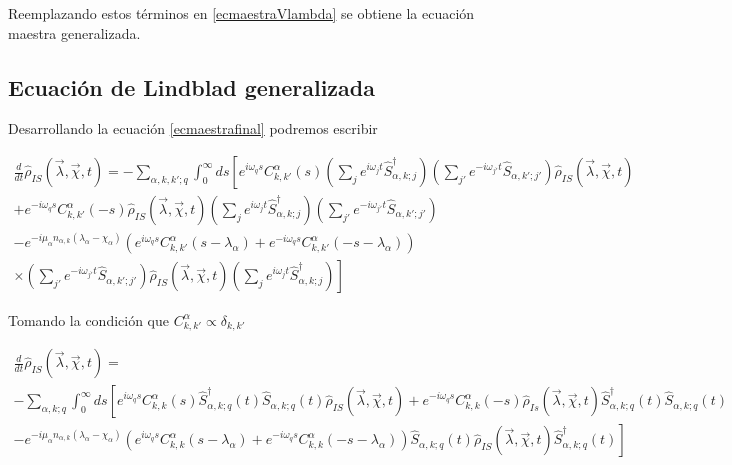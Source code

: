 \begin{appendixs}
Reemplazando estos términos en \ref{ecmaestraVlambda} se obtiene la ecuación maestra generalizada.   

\label{finalequation}

\newpage

\subsection{Ecuación de Lindblad generalizada}
Desarrollando la ecuación \ref{ecmaestrafinal} podremos escribir

\begin{multline*}
    \frac{d}{dt}\hat{\rho}_{IS}(\vec{\lambda},\vec{\chi},t) = - \sum_{\alpha,k,k';q} \int_{0}^{\infty}ds \left[e^{i\omega_{q}s}C^{\alpha}_{k,k'}(s) \left(\sum_{j}e^{i\omega_{j}t}\hat{S}^{\dagger}_{\alpha,k;j} \right)\left(\sum_{j'}e^{-i\omega_{j'}t}\hat{S}_{\alpha,k';j'} \right)\hat{\rho}_{IS}(\vec{\lambda},\vec{\chi},t)  \right. \\
    \left. +  e^{-i\omega_{q}s}C^{\alpha}_{k,k'}(-s) \hat{\rho}_{IS}(\vec{\lambda},\vec{\chi},t) \left(\sum_{j}e^{i\omega_{j}t}\hat{S}^{\dagger}_{\alpha,k;j} \right)\left(\sum_{j'}e^{-i\omega_{j'}t}\hat{S}_{\alpha,k';j'} \right)\right. \\
    \left. - e^{-i\mu_{\alpha}n_{\alpha,k}(\lambda_{\alpha}-\chi_{\alpha})}(e^{i\omega_{q}s}C^{\alpha}_{k,k'}(s-\lambda_{\alpha}) + e^{-i\omega_{q}s}C^{\alpha}_{k,k'}(-s-\lambda_{\alpha}) ) \right.\\
    \left.\times \left(\sum_{j'}e^{-i\omega_{j'}t}\hat{S}_{\alpha,k';j'} \right)\hat{\rho}_{IS}(\vec{\lambda},\vec{\chi},t) \left(\sum_{j}e^{i\omega_{j}t}\hat{S}^{\dagger}_{\alpha,k;j} \right)    \right]    
\end{multline*}

Tomando la condición que $C_{k,k'}^{\alpha} \propto \delta_{k,k'}$

\begin{multline*}
    \frac{d}{dt}\hat{\rho}_{IS}(\vec{\lambda},\vec{\chi},t) = \\
     - \sum_{\alpha,k;q} \int_{0}^{\infty}ds \left[e^{i\omega_{q}s}C^{\alpha}_{k,k}(s) \hat{S}^{\dagger}_{\alpha,k;q}(t)\hat{S}_{\alpha,k;q}(t)\hat{\rho}_{IS}(\vec{\lambda},\vec{\chi},t)  +  e^{-i\omega_{q}s}C^{\alpha}_{k,k}(-s) \hat{\rho}_{Is}(\vec{\lambda},\vec{\chi},t) \hat{S}^{\dagger}_{\alpha,k;q}(t) \hat{S}_{\alpha,k;q}(t) \right. \\
    \left. - e^{-i\mu_{\alpha}n_{\alpha,k}(\lambda_{\alpha}-\chi_{\alpha})}(e^{i\omega_{q}s}C^{\alpha}_{k,k}(s-\lambda_{\alpha}) + e^{-i\omega_{q}s}C^{\alpha}_{k,k}(-s-\lambda_{\alpha}) ) \hat{S}_{\alpha,k;q}(t) \hat{\rho}_{IS}(\vec{\lambda},\vec{\chi},t) \hat{S}^{\dagger}_{\alpha,k;q}(t)    \right]    
\end{multline*}


\end{appendixs}

